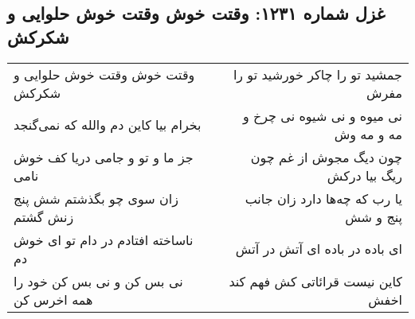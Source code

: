 \begin{center}
\section*{غزل شماره ۱۲۳۱: وقتت خوش وقتت خوش حلوایی و شکرکش}
\label{sec:1231}
\begin{longtable}{l p{0.5cm} r}
وقتت خوش وقتت خوش حلوایی و شکرکش
&&
جمشید تو را چاکر خورشید تو را مفرش
\\
بخرام بیا کاین دم والله که نمی‌گنجد
&&
نی میوه و نی شیوه نی چرخ و مه و مه وش
\\
جز ما و تو و جامی دریا کف خوش نامی
&&
چون دیگ مجوش از غم چون ریگ بیا درکش
\\
زان سوی چو بگذشتم شش پنج زنش گشتم
&&
یا رب که چه‌ها دارد زان جانب پنج و شش
\\
ناساخته افتادم در دام تو ای خوش دم
&&
ای باده در باده ای آتش در آتش
\\
نی بس کن و نی بس کن خود را همه اخرس کن
&&
کاین نیست قرائاتی کش فهم کند اخفش
\\
\end{longtable}
\end{center}
